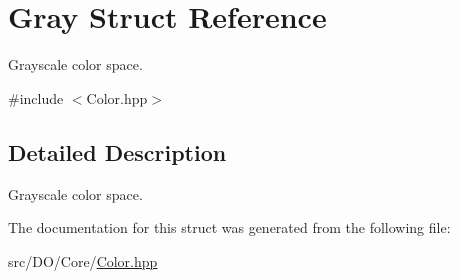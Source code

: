\hypertarget{struct_d_o_1_1_gray}{\section{Gray Struct Reference}
\label{struct_d_o_1_1_gray}
}


Grayscale color space.  




{\ttfamily \#include $<$Color.\-hpp$>$}



\subsection{Detailed Description}
Grayscale color space. 

The documentation for this struct was generated from the following file\-:\begin{DoxyCompactItemize}
\item 
src/\-D\-O/\-Core/\hyperlink{_color_8hpp}{Color.\-hpp}\end{DoxyCompactItemize}
